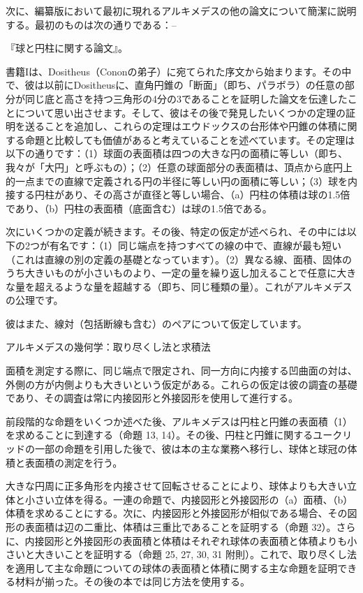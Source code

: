 \documentclass[a4paper,11pt,openany]{ltjsbook}
\begin{document}
次に、編纂版において最初に現れるアルキメデスの他の論文について簡潔に説明する。最初のものは次の通りである：--

『球と円柱に関する論文』。

書籍Iは、Dositheus（Cononの弟子）に宛てられた序文から始まります。その中で、彼は以前にDositheusに、直角円錐の「断面」（即ち、パラボラ）の任意の部分が同じ底と高さを持つ三角形の4分の3であることを証明した論文を伝達したことについて思い出させます。そして、彼はその後で発見したいくつかの定理の証明を送ることを追加し、これらの定理はエウドックスの台形体や円錐の体積に関する命題と比較しても価値があると考えていることを述べています。その定理は以下の通りです：（1）球面の表面積は四つの大きな円の面積に等しい（即ち、我々が「大円」と呼ぶもの）；（2）任意の球面部分の表面積は、頂点から底円上的一点までの直線で定義される円の半径に等しい円の面積に等しい；（3）球を内接する円柱があり、その高さが直径と等しい場合、（a）円柱の体積は球の1.5倍であり、（b）円柱の表面積（底面含む）は球の1.5倍である。

次にいくつかの定義が続きます。その後、特定の仮定が述べられ、その中には以下の2つが有名です：（1）同じ端点を持つすべての線の中で、直線が最も短い（これは直線の別の定義の基礎となっています）。（2）異なる線、面積、固体のうち大きいものが小さいものより、一定の量を繰り返し加えることで任意に大きな量を超えるような量を超越する（即ち、同じ種類の量）。これがアルキメデスの公理です。

彼はまた、線対（包括断線も含む）のペアについて仮定しています。

アルキメデスの幾何学：取り尽くし法と求積法

面積を測定する際に、同じ端点で限定され、同一方向に内接する凹曲面の対は、外側の方が内側よりも大きいという仮定がある。これらの仮定は彼の調査の基礎であり、その調査は常に内接図形と外接図形を使用して進行する。

前段階的な命題をいくつか述べた後、アルキメデスは円柱と円錐の表面積（1）を求めることに到達する（命題 13, 14）。その後、円柱と円錐に関するユークリッドの一部の命題を引用した後で、彼は本の主な業務へ移行し、球体と球冠の体積と表面積の測定を行う。

大きな円周に正多角形を内接させて回転させることにより、球体よりも大きい立体と小さい立体を得る。一連の命題で、内接図形と外接図形の（a）面積、（b）体積を求めることにする。次に、内接図形と外接図形が相似である場合、その図形の表面積は辺の二重比、体積は三重比であることを証明する（命題 32）。さらに、内接図形と外接図形の表面積と体積はそれぞれ球体の表面積と体積よりも小さいと大きいことを証明する（命題 25, 27, 30, 31 附則）。これで、取り尽くし法を適用して主な命題についての球体の表面積と体積に関する主な命題を証明できる材料が揃った。その後の本では同じ方法を使用する。
\end{document}
